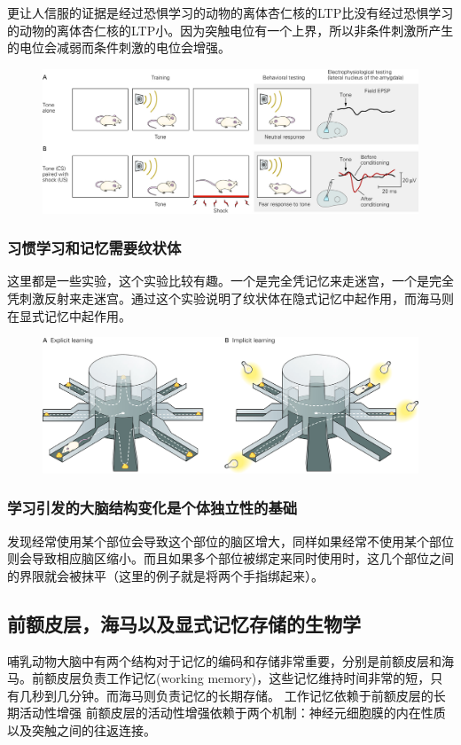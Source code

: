 \documentclass[UTF8,nofonts]{ctexart}
\begin{document}
\par
更让人信服的证据是经过恐惧学习的动物的离体杏仁核的LTP比没有经过恐惧学习的动物的离体杏仁核的LTP小。因为突触电位有一个上界，所以非条件刺激所产生的电位会减弱而条件刺激的电位会增强。
\begin{figure}[h]
	\centering
	\includegraphics[scale=0.9]{Pic/6613_PNS5.jpg}
\end{figure}
\subsubsection{习惯学习和记忆需要纹状体}
这里都是一些实验，这个实验比较有趣。一个是完全凭记忆来走迷宫，一个是完全凭刺激反射来走迷宫。通过这个实验说明了纹状体在隐式记忆中起作用，而海马则在显式记忆中起作用。
\newline
\begin{figure}[h]
	\centering
	\includegraphics[scale=0.9]{Pic/6615_PNS5.jpg}
\end{figure}

\subsubsection{学习引发的大脑结构变化是个体独立性的基础}
发现经常使用某个部位会导致这个部位的脑区增大，同样如果经常不使用某个部位则会导致相应脑区缩小。而且如果多个部位被绑定来同时使用时，这几个部位之间的界限就会被抹平（这里的例子就是将两个手指绑起来）。
\subsection{前额皮层，海马以及显式记忆存储的生物学}
哺乳动物大脑中有两个结构对于记忆的编码和存储非常重要，分别是前额皮层和海马。前额皮层负责工作记忆(working memory)，这些记忆维持时间非常的短，只有几秒到几分钟。而海马则负责记忆的长期存储。
工作记忆依赖于前额皮层的长期活动性增强
前额皮层的活动性增强依赖于两个机制：神经元细胞膜的内在性质以及突触之间的往返连接。
\end{document}
